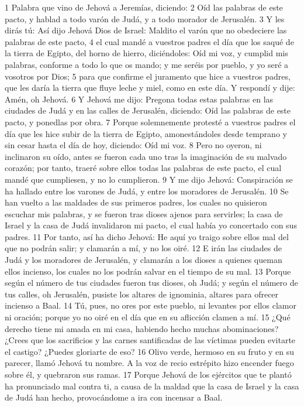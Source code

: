 1 Palabra que vino de Jehová a Jeremías, diciendo:
2 Oíd las palabras de este pacto, y hablad a todo varón de Judá, y a todo morador de Jerusalén.
3 Y les dirás tú: Así dijo Jehová Dios de Israel: Maldito el varón que no obedeciere las palabras de este pacto,
4 el cual mandé a vuestros padres el día que los saqué de la tierra de Egipto, del horno de hierro, diciéndoles: Oíd mi voz, y cumplid mis palabras, conforme a todo lo que os mando; y me seréis por pueblo, y yo seré a vosotros por Dios;
5 para que confirme el juramento que hice a vuestros padres, que les daría la tierra que fluye leche y miel, como en este día. Y respondí y dije: Amén, oh Jehová.
6 Y Jehová me dijo: Pregona todas estas palabras en las ciudades de Judá y en las calles de Jerusalén, diciendo: Oíd las palabras de este pacto, y ponedlas por obra.
7 Porque solemnemente protesté a vuestros padres el día que les hice subir de la tierra de Egipto, amonestándoles desde temprano y sin cesar hasta el día de hoy, diciendo: Oíd mi voz.
8 Pero no oyeron, ni inclinaron su oído, antes se fueron cada uno tras la imaginación de su malvado corazón; por tanto, traeré sobre ellos todas las palabras de este pacto, el cual mandé que cumpliesen, y no lo cumplieron.
9 Y me dijo Jehová: Conspiración se ha hallado entre los varones de Judá, y entre los moradores de Jerusalén.
10 Se han vuelto a las maldades de sus primeros padres, los cuales no quisieron escuchar mis palabras, y se fueron tras dioses ajenos para servirles; la casa de Israel y la casa de Judá invalidaron mi pacto, el cual había yo concertado con sus padres.
11 Por tanto, así ha dicho Jehová: He aquí yo traigo sobre ellos mal del que no podrán salir; y clamarán a mí, y no los oiré.
12 E irán las ciudades de Judá y los moradores de Jerusalén, y clamarán a los dioses a quienes queman ellos incienso, los cuales no los podrán salvar en el tiempo de su mal.
13 Porque según el número de tus ciudades fueron tus dioses, oh Judá; y según el número de tus calles, oh Jerusalén, pusiste los altares de ignominia, altares para ofrecer incienso a Baal.
14 Tú, pues, no ores por este pueblo, ni levantes por ellos clamor ni oración; porque yo no oiré en el día que en su aflicción clamen a mí.
15 ¿Qué derecho tiene mi amada en mi casa, habiendo hecho muchas abominaciones? ¿Crees que los sacrificios y las carnes santificadas de las víctimas pueden evitarte el castigo? ¿Puedes gloriarte de eso?
16 Olivo verde, hermoso en su fruto y en su parecer, llamó Jehová tu nombre. A la voz de recio estrépito hizo encender fuego sobre él, y quebraron sus ramas.
17 Porque Jehová de los ejércitos que te plantó ha pronunciado mal contra ti, a causa de la maldad que la casa de Israel y la casa de Judá han hecho, provocándome a ira con incensar a Baal.

